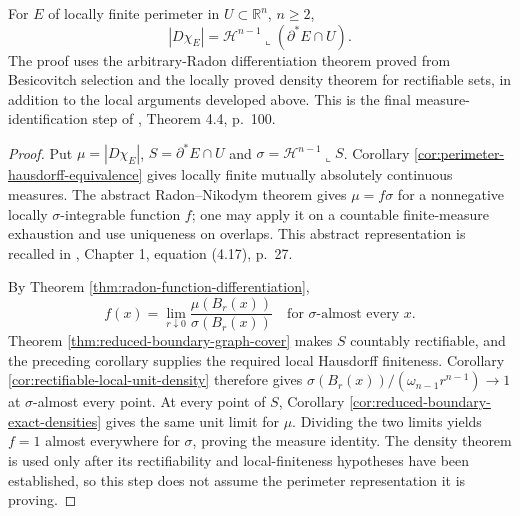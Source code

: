 \begin{theorem}\label{thm:perimeter-hausdorff-identification}
For $E$ of locally finite perimeter in $U\subset\mathbb R^n$, $n\geq2$,
\[
 |D\chi_E|=\mathcal H^{n-1}\llcorner(\partial^*E\cap U).
\]
The proof uses the arbitrary-Radon differentiation theorem proved from Besicovitch selection and the locally proved density theorem for rectifiable sets, in addition to the local arguments developed above. This is the final measure-identification step of \cite{Sim18}, Theorem 4.4, p.~100.
\end{theorem}
\begin{proof}
Put $\mu=|D\chi_E|$, $S=\partial^*E\cap U$ and $\sigma=\mathcal H^{n-1}\llcorner S$. Corollary \ref{cor:perimeter-hausdorff-equivalence} gives locally finite mutually absolutely continuous measures. The abstract Radon--Nikodym theorem gives $\mu=f\sigma$ for a nonnegative locally $\sigma$-integrable function $f$; one may apply it on a countable finite-measure exhaustion and use uniqueness on overlaps. This abstract representation is recalled in \cite{Sim18}, Chapter 1, equation (4.17), p.~27.

By Theorem \ref{thm:radon-function-differentiation},
\[
 f(x)=\lim_{r\downarrow0}\frac{\mu(B_r(x))}{\sigma(B_r(x))}
 \quad\text{for }\sigma\text{-almost every }x.
\]
Theorem \ref{thm:reduced-boundary-graph-cover} makes $S$ countably rectifiable, and the preceding corollary supplies the required local Hausdorff finiteness. Corollary \ref{cor:rectifiable-local-unit-density} therefore gives $\sigma(B_r(x))/(\omega_{n-1}r^{n-1})\to1$ at $\sigma$-almost every point. At every point of $S$, Corollary \ref{cor:reduced-boundary-exact-densities} gives the same unit limit for $\mu$. Dividing the two limits yields $f=1$ almost everywhere for $\sigma$, proving the measure identity. The density theorem is used only after its rectifiability and local-finiteness hypotheses have been established, so this step does not assume the perimeter representation it is proving.
\end{proof}
